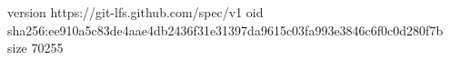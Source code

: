 version https://git-lfs.github.com/spec/v1
oid sha256:ee910a5c83de4aae4db2436f31e31397da9615c03fa993e3846c6f0c0d280f7b
size 70255
